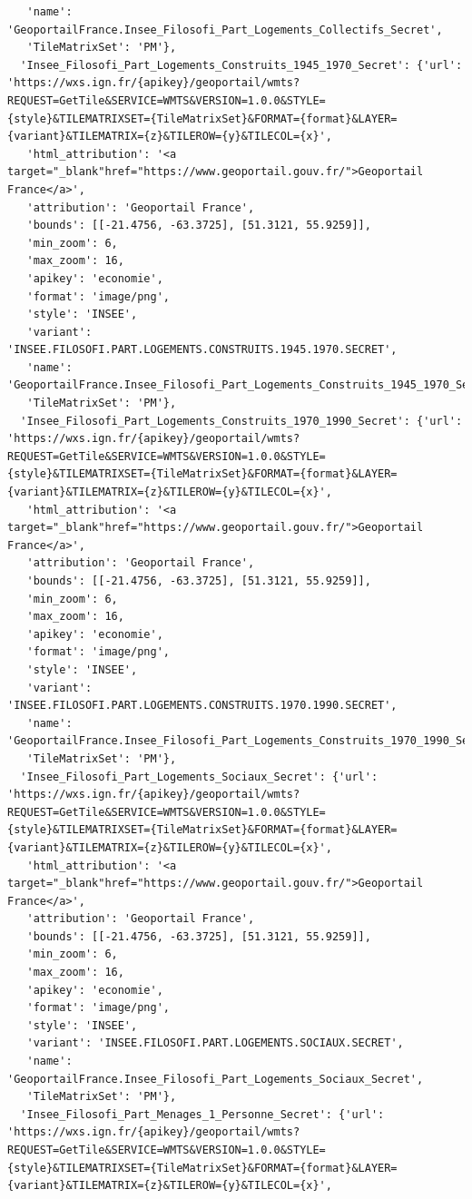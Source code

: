 \documentclass[
  letterpaper,
  DIV=11,
  numbers=noendperiod]{scrreprt}
\begin{document}
\begin{verbatim}
   'name': 'GeoportailFrance.Insee_Filosofi_Part_Logements_Collectifs_Secret',
   'TileMatrixSet': 'PM'},
  'Insee_Filosofi_Part_Logements_Construits_1945_1970_Secret': {'url': 'https://wxs.ign.fr/{apikey}/geoportail/wmts?REQUEST=GetTile&SERVICE=WMTS&VERSION=1.0.0&STYLE={style}&TILEMATRIXSET={TileMatrixSet}&FORMAT={format}&LAYER={variant}&TILEMATRIX={z}&TILEROW={y}&TILECOL={x}',
   'html_attribution': '<a target="_blank"href="https://www.geoportail.gouv.fr/">Geoportail France</a>',
   'attribution': 'Geoportail France',
   'bounds': [[-21.4756, -63.3725], [51.3121, 55.9259]],
   'min_zoom': 6,
   'max_zoom': 16,
   'apikey': 'economie',
   'format': 'image/png',
   'style': 'INSEE',
   'variant': 'INSEE.FILOSOFI.PART.LOGEMENTS.CONSTRUITS.1945.1970.SECRET',
   'name': 'GeoportailFrance.Insee_Filosofi_Part_Logements_Construits_1945_1970_Secret',
   'TileMatrixSet': 'PM'},
  'Insee_Filosofi_Part_Logements_Construits_1970_1990_Secret': {'url': 'https://wxs.ign.fr/{apikey}/geoportail/wmts?REQUEST=GetTile&SERVICE=WMTS&VERSION=1.0.0&STYLE={style}&TILEMATRIXSET={TileMatrixSet}&FORMAT={format}&LAYER={variant}&TILEMATRIX={z}&TILEROW={y}&TILECOL={x}',
   'html_attribution': '<a target="_blank"href="https://www.geoportail.gouv.fr/">Geoportail France</a>',
   'attribution': 'Geoportail France',
   'bounds': [[-21.4756, -63.3725], [51.3121, 55.9259]],
   'min_zoom': 6,
   'max_zoom': 16,
   'apikey': 'economie',
   'format': 'image/png',
   'style': 'INSEE',
   'variant': 'INSEE.FILOSOFI.PART.LOGEMENTS.CONSTRUITS.1970.1990.SECRET',
   'name': 'GeoportailFrance.Insee_Filosofi_Part_Logements_Construits_1970_1990_Secret',
   'TileMatrixSet': 'PM'},
  'Insee_Filosofi_Part_Logements_Sociaux_Secret': {'url': 'https://wxs.ign.fr/{apikey}/geoportail/wmts?REQUEST=GetTile&SERVICE=WMTS&VERSION=1.0.0&STYLE={style}&TILEMATRIXSET={TileMatrixSet}&FORMAT={format}&LAYER={variant}&TILEMATRIX={z}&TILEROW={y}&TILECOL={x}',
   'html_attribution': '<a target="_blank"href="https://www.geoportail.gouv.fr/">Geoportail France</a>',
   'attribution': 'Geoportail France',
   'bounds': [[-21.4756, -63.3725], [51.3121, 55.9259]],
   'min_zoom': 6,
   'max_zoom': 16,
   'apikey': 'economie',
   'format': 'image/png',
   'style': 'INSEE',
   'variant': 'INSEE.FILOSOFI.PART.LOGEMENTS.SOCIAUX.SECRET',
   'name': 'GeoportailFrance.Insee_Filosofi_Part_Logements_Sociaux_Secret',
   'TileMatrixSet': 'PM'},
  'Insee_Filosofi_Part_Menages_1_Personne_Secret': {'url': 'https://wxs.ign.fr/{apikey}/geoportail/wmts?REQUEST=GetTile&SERVICE=WMTS&VERSION=1.0.0&STYLE={style}&TILEMATRIXSET={TileMatrixSet}&FORMAT={format}&LAYER={variant}&TILEMATRIX={z}&TILEROW={y}&TILECOL={x}',

\end{verbatim}
\end{document}
